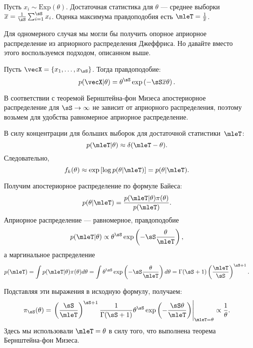 \begin{example}
Пусть $x_i \sim \mathrm{Exp}(\theta)$.
Достаточная статистика для $\theta$ --- среднее выборки $\overline{x} = \frac{1}{\sS} \sum_{i = 1}^\sS x_i$.
Оценка максимума правдоподобия есть $\mleT = \frac{1}{\overline{x}}$.

Для одномерного случая мы могли бы получить опорное априорное распределение из априорного распределения Джеффриса.
Но давайте вместо этого воспользуемся подходом, описанном выше.

Пусть $\vecX = \{x_1, \ldots, x_\sS \}$. Тогда правдоподобие:
\[
p(\vecX | \theta) = \theta^{\sS} \exp \left(-\sS \overline{x} \theta\right).
\]

В соответствии с теоремой Бернштейна-фон Мизеса апостериорное распределение для $\sS \rightarrow \infty$ не зависит от априорного распределения, поэтому возьмем для удобства равномерное априорное распределение.

В силу концентрации для больших выборок для достаточной статистики~$\mleT$:
\[
p(\mleT | \theta) \approx \delta(\mleT - \theta).
\]
Следовательно,
\[
f_k(\theta) \approx \exp \left[\log p(\theta | \mleT) \right] = p(\theta | \mleT).
\]

Получим апостериорное распределение по формуле Байеса:
\[
p(\theta | \mleT) = \frac{p( \mleT | \theta) \pi(\theta)}{p(\mleT)}.
\]
Априорное распределение --- равномерное, правдоподобие 
\[
p(\mleT | \theta) \propto \theta^{\sS} \exp \left(-\sS \frac{\theta}{\mleT} \right),
\]
а маргинальное распределение 
\[
p(\mleT) = \int p(\mleT | \theta) \pi(\theta) d\theta = \int \theta^\sS \exp \left(-\sS \frac{\theta}{\mleT} \right) d\theta = \Gamma(\sS + 1) \left(\frac{\mleT}{\sS} \right)^{\sS + 1}.
\]

Подставляя эти выражения в исходную формулу, получаем:
\[
\pi_\sS(\theta) = \left. \left(\frac{\sS}{\mleT}\right)^{\sS + 1} \frac{1}{\Gamma(\sS + 1)} \theta^\sS \exp \left(- \frac{\sS \theta}{\mleT} \right) \right|_{\mleT = \theta} \propto \frac{1}{\theta}.
\]
Здесь мы использовали $\mleT = \theta$ в силу того, что выполнена теорема Бернштейна-фон Мизеса.
\end{example}

